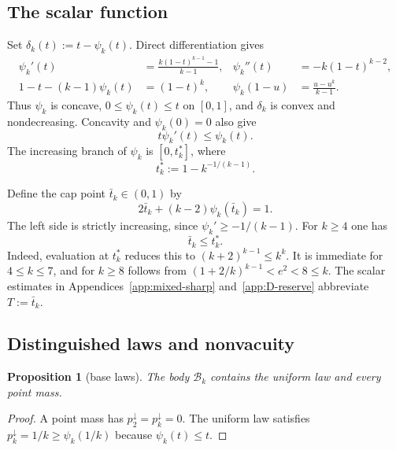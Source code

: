 \documentclass[11pt]{article}
\newtheorem{proposition}[theorem]{Proposition}
\theoremstyle{definition}
\theoremstyle{remark}
\newcommand{\body}{\mathcal{B}}
\newcommand{\down}{\downarrow}
\begin{document}
\subsection{The scalar function}\label{subsec:scalar}

Set $\delta_k(t):=t-\psi_k(t)$.  Direct differentiation gives
\begin{align}
  \psi_k'(t)&=\frac{k(1-t)^{k-1}-1}{k-1},
  &\psi_k''(t)&=-k(1-t)^{k-2},\label{eq:psi-derivatives}\\
  1-t-(k-1)\psi_k(t)&=(1-t)^k,
  &\psi_k(1-u)&=\frac{u-u^k}{k-1}.\label{eq:psi-identities}
\end{align}
Thus $\psi_k$ is concave, $0\le\psi_k(t)\le t$ on $[0,1]$, and
$\delta_k$ is convex and nondecreasing.  Concavity and $\psi_k(0)=0$ also
give
\begin{equation}\label{eq:star-shaped}
  t\psi_k'(t)\le\psi_k(t).
\end{equation}
The increasing branch of $\psi_k$ is $[0,t_k^*]$, where
\begin{equation}\label{eq:tstar}
  t_k^*:=1-k^{-1/(k-1)}.
\end{equation}

Define the cap point $\bar t_k\in(0,1)$ by
\begin{equation}\label{eq:cap-root}
  2\bar t_k+(k-2)\psi_k(\bar t_k)=1.
\end{equation}
The left side is strictly increasing, since
$\psi_k'\ge-1/(k-1)$.  For $k\ge4$ one has
\begin{equation}\label{eq:cap-increasing}
  \bar t_k\le t_k^*.
\end{equation}
Indeed, evaluation at $t_k^*$ reduces this to
$(k+2)^{k-1}\le k^k$.  It is immediate for $4\le k\le7$, and for
$k\ge8$ follows from $(1+2/k)^{k-1}<e^2<8\le k$.  The scalar estimates in
Appendices~\ref{app:mixed-sharp} and~\ref{app:D-reserve} abbreviate
$T:=\bar t_k$.

\subsection{Distinguished laws and nonvacuity}

\begin{proposition}[base laws]
\label{prop:B-base-laws}
The body $\body_k$ contains the uniform law and every point mass.
\end{proposition}

\begin{proof}
A point mass has $p_2^\down=p_k^\down=0$.  The uniform law satisfies
$p_k^\down=1/k\ge\psi_k(1/k)$ because $\psi_k(t)\le t$.
\end{proof}
\end{document}

